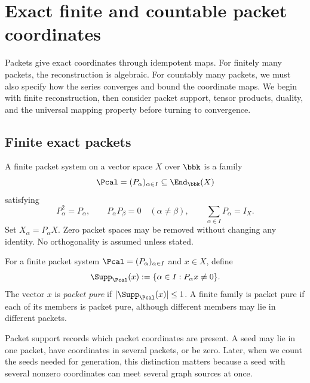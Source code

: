 \section{Exact finite and countable packet coordinates}



\begin{readerroadmap}
Packets give exact coordinates through idempotent maps.  For finitely many packets, the reconstruction is algebraic.  For countably many packets, we must also specify how the series converges and bound the coordinate maps.  We begin with finite reconstruction, then consider packet support, tensor products, duality, and the universal mapping property before turning to convergence.
\end{readerroadmap}
\subsection{Finite exact packets}

\begin{definition}
\label{def:packet-system}
A finite packet system on a vector space $X$ over $\bbk$ is a family
\[
\Pcal=(P_\alpha)_{\alpha\in I}\subseteq\End_{\bbk}(X)
\]
satisfying
\[
P_\alpha^2=P_\alpha,
\qquad
P_\alpha P_\beta=0\quad(\alpha\neq\beta),
\qquad
\sum_{\alpha\in I}P_\alpha=I_X.
\]
Set $X_\alpha=P_\alpha X$.  Zero packet spaces may be removed without changing any identity.  No orthogonality is assumed unless stated.
\end{definition}

\begin{definition}
\label{def:packet-support}
For a finite packet system \(\Pcal=(P_\alpha)_{\alpha\in I}\) and \(x\in X\), define
\[
\Supp_{\Pcal}(x)
:=
\{\alpha\in I:P_\alpha x\neq0\}.
\]
The vector \(x\) is \emph{packet pure} if \(|\Supp_{\Pcal}(x)|\leq1\).  A finite family is packet pure if each of its members is packet pure, although different members may lie in different packets.
\end{definition}

\begin{interpretation}
Packet support records which packet coordinates are present.  A seed may lie in one packet, have coordinates in several packets, or be zero.  Later, when we count the seeds needed for generation, this distinction matters because a seed with several nonzero coordinates can meet several graph sources at once.
\end{interpretation}


